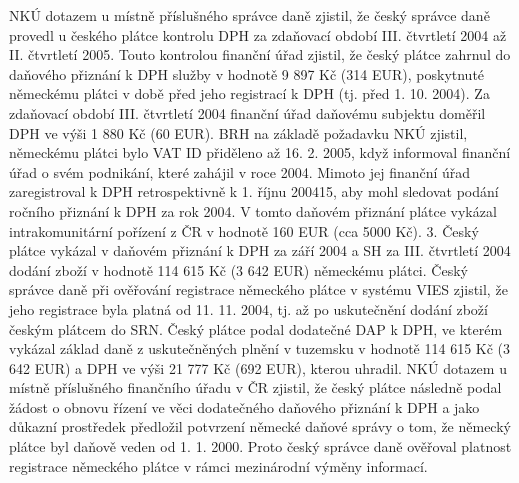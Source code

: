 \documentclass[10pt]{article}
\begin{document}
NKÚ dotazem u místně příslušného správce daně zjistil, že český správce daně provedl u českého plátce kontrolu DPH za zdaňovací období III. čtvrtletí 2004 až II. čtvrtletí 2005.
Touto kontrolou finanční úřad zjistil, že český plátce zahrnul do daňového přiznání k DPH služby v hodnotě 9 897 Kč (314 EUR), poskytnuté německému plátci v době před jeho registrací k DPH (tj. před 1. 10. 2004).
Za zdaňovací období III. čtvrtletí 2004 finanční úřad daňovému subjektu doměřil DPH ve výši 1 880 Kč (60 EUR).
BRH na základě požadavku NKÚ zjistil, německému plátci bylo VAT ID přiděleno až 16. 2. 2005, když informoval finanční úřad o svém podnikání, které zahájil v roce 2004.
Mimoto jej finanční úřad zaregistroval k DPH retrospektivně k 1. říjnu 200415, aby mohl sledovat podání ročního přiznání k DPH za rok 2004.
V tomto daňovém přiznání plátce vykázal intrakomunitární pořízení z ČR v hodnotě 160 EUR (cca 5000 Kč).
3. Český plátce vykázal v daňovém přiznání k DPH za září 2004 a SH za III. čtvrtletí 2004 dodání zboží v hodnotě 114 615 Kč (3 642 EUR) německému plátci.
Český správce daně při ověřování registrace německého plátce v systému VIES zjistil, že jeho registrace byla platná od 11. 11. 2004, tj. až po uskutečnění dodání zboží českým plátcem do SRN.
Český plátce podal dodatečné DAP k DPH, ve kterém vykázal základ daně z uskutečněných plnění v tuzemsku v hodnotě 114 615 Kč (3 642 EUR) a DPH ve výši 21 777 Kč (692 EUR), kterou uhradil.
NKÚ dotazem u místně příslušného finančního úřadu v ČR zjistil, že český plátce následně podal žádost o obnovu řízení ve věci dodatečného daňového přiznání k DPH a jako důkazní prostředek předložil potvrzení německé daňové správy o tom, že německý plátce byl daňově veden od 1. 1. 2000.
Proto český správce daně ověřoval platnost registrace německého plátce v rámci mezinárodní výměny informací.
\end{document}
